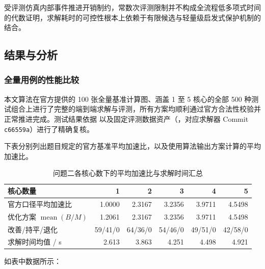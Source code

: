 \documentclass[anonymous,withtoc]{gmcm2026}
\begin{document}
受评测仿真内部事件推进开销制约，常数次评测限制并不构成全流程低多项式时间的代数证明，求解耗时的可控性根本上依赖于有限候选与轻量级启发式保护机制的结合。

\subsection{结果与分析}

\subsubsection{全量用例的性能比较}

本文算法在官方提供的 100 张全量基准计算图、涵盖 1 至 5 核心的全部 500 种测试组合上进行了完整的端到端求解与评测，所有方案均顺利通过官方合法性校验并正常推进完成。测试结果依据 \texttt{} 以及固定评测数据资产（\texttt{}，对应求解器 Commit \texttt{c66559a}）进行了精确复核。

下表分别列出题目规定的官方基准平均加速比，以及使用算法输出方案计算的平均加速比。



\begin{table}[!htbp]\centering
\caption{问题二各核心数下的平均加速比与求解时间汇总}\label{tab:05-p2-1}\normalsize

\begin{tabularx}{\linewidth}{@{}Xrrrrr@{}}\toprule
核心数量 & 1 & 2 & 3 & 4 & 5 \\
\midrule
官方口径平均加速比 & 1.0000 & 2.3167 & 3.2356 & 3.9711 & 4.5498 \\
优化方案 $\operatorname{mean}(B/M)$ & 1.2061 & 2.3167 & 3.2356 & 3.9711 & 4.5498 \\
改善/持平/退化 & 59/41/0 & 64/36/0 & 54/46/0 & 49/51/0 & 42/58/0 \\
求解时间均值 / s & 2.613 & 3.863 & 4.251 & 4.498 & 4.921 \\
\bottomrule\end{tabularx}\end{table}

如表中数据所示：
\end{document}
